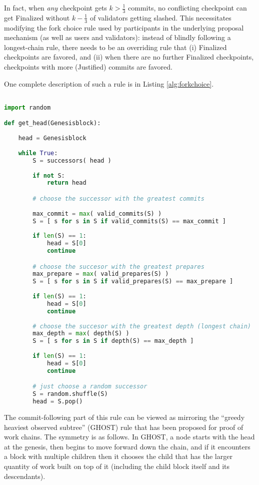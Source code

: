 \documentclass[12pt]{article}
\begin{document}
In fact, when \textit{any} checkpoint gets $k > \frac{1}{3}$ commits, no conflicting checkpoint can get Finalized without $k - \frac{1}{3}$ of validators getting slashed. This necessitates modifying the fork choice rule used by participants in the underlying proposal mechanism (as well as users and validators): instead of blindly following a longest-chain rule, there needs to be an overriding rule that (i) Finalized checkpoints are favored, and (ii) when there are no further Finalized checkpoints, checkpoints with more (Justified) commits are favored.

One complete description of such a rule is in Listing \ref{alg:forkchoice}.

\begin{lstlisting}[language=Python, caption={Algorithm for determining the head}, captionpos=b, label={alg:forkchoice}]

import random

def get_head(Genesisblock):
    
    head = Genesisblock
    
    while True:
        S = successors( head )
        
        if not S:
            return head

        # choose the successor with the greatest commits
        
        max_commit = max( valid_commits(S) )        
        S = [ s for s in S if valid_commits(S) == max_commit ]
        
        if len(S) == 1:
            head = S[0]
            continue

        # choose the succesor with the greatest prepares
        max_prepare = max( valid_prepares(S) )
        S = [ s for s in S if valid_prepares(S) == max_prepare ]
        
        if len(S) == 1:
            head = S[0]
            continue
        
        # choose the succesor with the greatest depth (longest chain)
        max_depth = max( depth(S) )
        S = [ s for s in S if depth(S) == max_depth ]
        
        if len(S) == 1:
            head = S[0]
            continue

        # just choose a random successor
        S = random.shuffle(S)
        head = S.pop()

\end{lstlisting}

The commit-following part of this rule can be viewed as mirroring the ``greedy heaviest observed subtree'' (GHOST) rule that has been proposed for proof of work chains\cite{sompolinsky2013accelerating}. The symmetry is as follows. In GHOST, a node starts with the head at the genesis, then begins to move forward down the chain, and if it encounters a block with multiple children then it chooses the child that has the larger quantity of work built on top of it (including the child block itself and its descendants).
\end{document}
